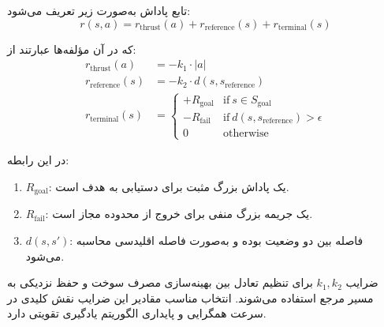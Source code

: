 تابع پاداش به‌صورت زیر تعریف می‌شود:
\[
r(s, a) = r_{\text{thrust}}(a) + r_{\text{reference}}(s) + r_{\text{terminal}}(s)
\]

که در آن مؤلفه‌ها عبارتند از:
\begin{align}
	r_{\text{thrust}}(a) &= -k_1 \cdot |a| \\
	r_{\text{reference}}(s) &= -k_2 \cdot d(s, s_{\text{reference}}) \\
	r_{\text{terminal}}(s) &= 
	\begin{cases}
		+R_{\text{goal}} & \text{if} ~ s \in S_{\text{goal}} \\
		-R_{\text{fail}} & \text{if} ~ d(s, s_{\text{reference}}) > \epsilon \\
		0 & \text{otherwise}
	\end{cases}
\end{align}

در این رابطه:  
\begin{enumerate}
	\item \(R_{\text{goal}}\): یک پاداش بزرگ مثبت برای دستیابی به هدف است.
	\item \(R_{\text{fail}}\): یک جریمه بزرگ منفی برای خروج از محدوده مجاز است.
	\item \(d(s, s')\): فاصله بین دو وضعیت بوده و به‌صورت فاصله اقلیدسی محاسبه می‌شود.
\end{enumerate}


ضرایب \(k_1, k_2\) برای تنظیم تعادل بین بهینه‌سازی مصرف سوخت و حفظ نزدیکی به مسیر مرجع استفاده می‌شوند. انتخاب مناسب مقادیر این ضرایب نقش کلیدی در سرعت همگرایی و پایداری الگوریتم یادگیری تقویتی دارد.  







